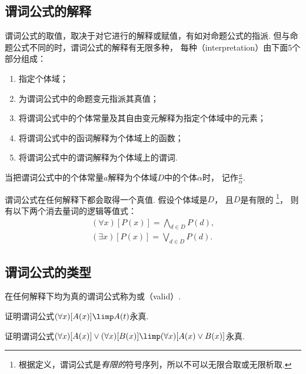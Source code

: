\subsection{谓词公式的解释}
谓词公式的取值，取决于对它进行的解释或赋值，有如对命题公式的指派.
但与命题公式不同的时，谓词公式的解释有无限多种，
每种（interpretation）由下面5个部分组成：\begin{enumerate}
	\item 指定个体域；
	\item 为谓词公式中的命题变元指派其真值；
	\item 将谓词公式中的个体常量及其自由变元解释为指定个体域中的元素；
	\item 将谓词公式中的函词解释为个体域上的函数；
	\item 将谓词公式中的谓词解释为个体域上的谓词.
\end{enumerate}

当把谓词公式中的个体常量\(a\)解释为个体域\(D\)中的个体\(\alpha\)时，
记作\(\frac{a}{\alpha}\).

谓词公式在任何解释下都会取得一个真值.
假设个体域是\(D\)，
且\(D\)是有限的
\footnote{
	根据定义，谓词公式是\emph{有限的}符号序列，所以不可以无限合取或无限析取.
}，
则有以下两个消去量词的逻辑等值式：\begin{gather}
	(\forall x)[P(x)]
	= \bigwedge_{d \in D} P(d), \\
	(\exists x)[P(x)]
	= \bigvee_{d \in D} P(d).
\end{gather}

\subsection{谓词公式的类型}
在任何解释下均为真的谓词公式称为或（valid）.

\begin{example}
证明谓词公式\((\forall x)[A(x)] \limp A(t)\)永真.
\end{example}

\begin{example}
证明谓词公式\(
	(\forall x)[A(x)]
	\lor
	(\forall x)[B(x)]
	\limp
	(\forall x)
	[
		A(x) \lor B(x)
	]
\)永真.
\end{example}

